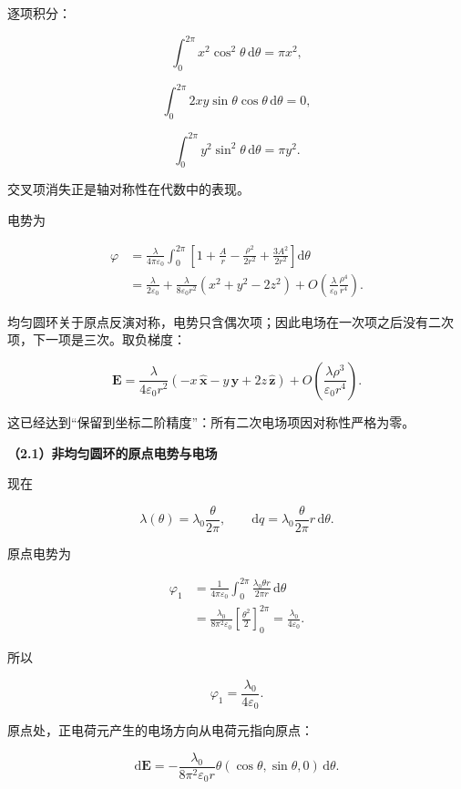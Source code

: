 \documentclass[12pt,a4paper,UTF8]{ctexart}
\begin{document}
逐项积分：

\[\int_0^{2\pi}x^2\cos^2\theta\,\mathrm d\theta=\pi x^2,\]

\[\int_0^{2\pi}2xy\sin\theta\cos\theta\,\mathrm d\theta=0,\]

\[\int_0^{2\pi}y^2\sin^2\theta\,\mathrm d\theta=\pi y^2.\]

交叉项消失正是轴对称性在代数中的表现。

电势为

\[\begin{aligned}
\varphi
&=\frac{\lambda}{4\pi\varepsilon_0}
\int_0^{2\pi}\left[1+\frac{A}{r}
-\frac{\rho^2}{2r^2}+\frac{3A^2}{2r^2}\right]\mathrm d\theta\\
&=\frac{\lambda}{2\varepsilon_0}
+\frac{\lambda}{8\varepsilon_0r^2}(x^2+y^2-2z^2)
+O\!\left(\frac{\lambda}{\varepsilon_0}\frac{\rho^4}{r^4}\right).
\end{aligned} \tag{4}\]

均匀圆环关于原点反演对称，电势只含偶次项；因此电场在一次项之后没有二次项，下一项是三次。取负梯度：

\[\boxed{
\boldsymbol E
=\frac{\lambda}{4\varepsilon_0r^2}
\left(-x\,\hat{\boldsymbol x}-y\,\hat{\boldsymbol y}
+2z\,\hat{\boldsymbol z}\right)+O\!\left(\frac{\lambda\rho^3}{\varepsilon_0r^4}\right)
}. \tag{5}\]

这已经达到``保留到坐标二阶精度''：所有二次电场项因对称性严格为零。

\textbf{（2.1）非均匀圆环的原点电势与电场}

现在

\[\lambda(\theta)=\lambda_0\frac{\theta}{2\pi},\qquad
\mathrm dq=\lambda_0\frac{\theta}{2\pi}r\,\mathrm d\theta.\]

原点电势为

\[\begin{aligned}
\varphi_1
&=\frac1{4\pi\varepsilon_0}
\int_0^{2\pi}\frac{\lambda_0\theta r}{2\pi r}\,\mathrm d\theta\\
&=\frac{\lambda_0}{8\pi^2\varepsilon_0}
\left[\frac{\theta^2}{2}\right]_0^{2\pi}
=\frac{\lambda_0}{4\varepsilon_0}. 
\end{aligned}\]

所以

\[\boxed{\varphi_1=\frac{\lambda_0}{4\varepsilon_0}}. \tag{6}\]

原点处，正电荷元产生的电场方向从电荷元指向原点：

\[\mathrm d\boldsymbol E
=-\frac{\lambda_0}{8\pi^2\varepsilon_0r}
\theta(\cos\theta,\sin\theta,0)\,\mathrm d\theta.\]
\end{document}
